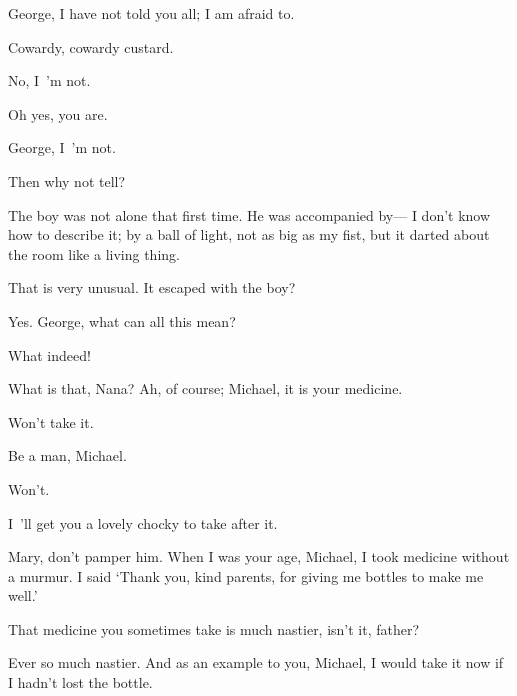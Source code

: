 \begin{drama}
George, I have not told you all; I am afraid to.

Cowardy, cowardy custard.

No, I~’m not.

\mrdarlingspeaks
Oh yes, you are.

\mrsdarlingspeaks
George, I~’m not.

\mrdarlingspeaks
Then why not tell?

\mrsdarlingspeaks
The boy was not alone that first time.
He was accompanied by—%
I don’t know how to describe it;
by a ball of light, not as big as my fist, but it darted about the room like a living thing.

That is very unusual.
It escaped with the boy?

\mrsdarlingspeaks
Yes.
George, what can all this mean?

What indeed!


What is that, Nana?
Ah, of course; Michael, it is your medicine.

Won’t take it.

Be a man, Michael.

\michaelspeaks
Won’t.

I~’ll get you a lovely chocky to take after it.

\mrdarlingspeaks
Mary, don’t pamper him.
When I was your age, Michael, I took medicine without a murmur.
I said ‘Thank you, kind parents, for giving me bottles to make me well.’


\wendyspeaks
That medicine you sometimes take is much nastier, isn’t it, father?

Ever so much nastier.
And as an example to you, Michael, I would take it now
if I hadn’t lost the bottle.


\end{drama}
